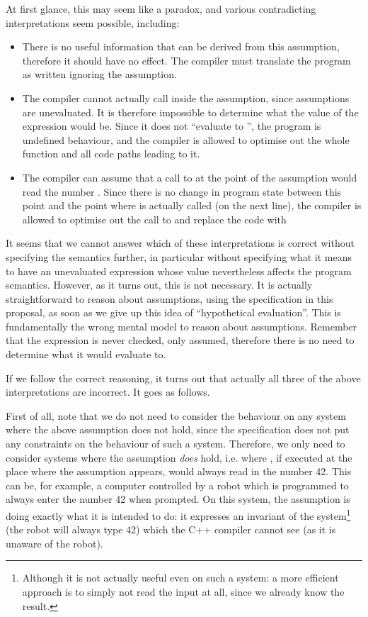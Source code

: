 At first glance, this may seem like a paradox, and various contradicting interpretations seem possible, including:
\begin{itemize}
\item There is no useful information that can be derived from this assumption, therefore it should have no effect. The compiler must translate the program as written ignoring the assumption.
\item The compiler cannot actually call  inside the assumption, since assumptions are unevaluated. It is therefore impossible to determine what the value of the expression would be. Since it does not ``evaluate to '', the program is undefined behaviour, and the compiler is allowed to optimise out the whole function  and all code paths leading to it.
\item The compiler can assume that a call to  at the point of the assumption would read the number . Since there is no change in program state between this point and the point where  is actually called (on the next line), the compiler is allowed to optimise out the call to  and replace the code with 
\end{itemize}

It seems that we cannot answer which of these interpretations is correct without specifying the semantics further, in particular without specifying what it means to have an unevaluated expression whose value nevertheless affects the program semantics. However, as it turns out, this is not necessary. It is actually straightforward to reason about assumptions, using the specification in this proposal, as soon as we give up this idea of ``hypothetical evaluation''. This is fundamentally the wrong mental model to reason about assumptions. Remember that the expression is never checked, only assumed, therefore there is no need to determine what it would evaluate to.

If we follow the correct reasoning, it turns out that actually all three of the above interpretations are incorrect. It goes as follows.

First of all, note that we do not need to consider the behaviour on any system where the above assumption does not hold, since the specification does not put any constraints on the behaviour of such a system. Therefore, we only need to consider systems where the assumption \emph{does} hold, i.e. where , if executed at the place where the assumption appears, would always read in the number 42. This can be, for example, a computer controlled by a robot which is programmed to always enter the number 42 when prompted. On this system, the assumption is doing exactly what it is intended to do: it expresses an invariant of the system\footnote{Although it is not actually useful even on such a system: a more efficient approach is to simply not read the input at all, since we already know the result.} (the robot will always type 42) which the C++ compiler cannot see (as it is unaware of the robot).

